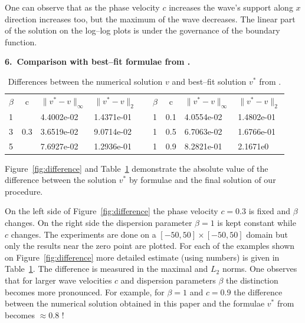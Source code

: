 \documentclass[leqno,11pt]{book}
\newcommand{\sect}[1]{\bigskip \par {\large\bf #1}}
\begin{document}
One can observe that as the phase velocity $c$ increases the wave's support  along $x$ direction increases too, but the maximum of the wave decreases. The linear part of the solution on the log--log plots is under the governance of the boundary function.

\bigskip


\sect{6.~Comparison with best--fit formulae from \cite{Ch2011}.}

\begin{center}
\begin{table}[ht]
\centering
\resizebox{12cm}{!} {
		\begin{tabular}{|l|c|l l| c|l|c|l l|}
			\cline{1-4}\cline{6-9}
$\beta$&c&$\|v^*-v \|_{\infty }$&$\|v^*-v \|_{2 }$& &$\beta$& c&$\|v^*-v \|_{\infty }$&$\|v^*-v \|_{2 }$\\
			\cline{1-4}\cline{6-9}
1&     &4.4002e-02 & 1.4371e-01 & &    1& 0.1& 4.0554e-02  &1.4802e-01\\
3& 0.3 &3.6519e-02 & 9.0714e-02& &    1& 0.5& 6.7063e-02  &1.6766e-01\\
5&     &7.6927e-02 & 1.2936e-01 & &    1& 0.9&  8.2821e-01 &2.1671e0\\
			\cline{1-4}\cline{6-9}
\end{tabular}
}
		\caption{Differences between the numerical solution $v$ and best--fit solution $v^*$ from \cite{Ch2011}.}
\label{tab:first-der-t}
\end{table}
\end{center}

Figure~\ref{fig:difference} and Table~\ref{tab:first-der-t} demonstrate the  absolute value of the difference between  the solution $v^*$ by formulae \cite{Ch2011}  and the final solution of our procedure.

On the left side of Figure~\ref{fig:difference} the phase velocity $c = 0.3$ is fixed  and $\beta$ changes. On the right side  the dispersion parameter $\beta=1$ is kept constant while $c$ changes. The experiments are done on a $[-50,  50] \times [-50,50]$  domain  but only the results near the zero point are plotted. For each of the examples shown on Figure~\ref{fig:difference} more detailed estimate (using numbers) is given in Table~\ref{tab:first-der-t}. The difference is measured in the maximal and $L_2$ norms. One observes that for larger wave velocities $c$ and dispersion parameters $\beta$ the distinction becomes more pronounced. For example, for $\beta =1$ and $c=0.9$ the difference between the numerical solution obtained in this paper and the formulae  $v^*$ from \cite{Ch2011} becomes $\approx 0.8$ !
\end{document}
